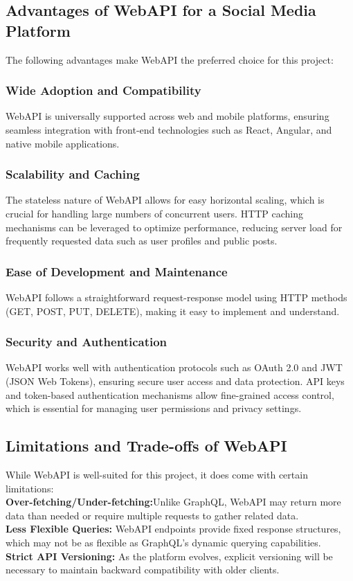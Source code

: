 \documentclass[a4paper, 11pt]{article}
\begin{document}
    \subsection{Advantages of WebAPI for a Social Media Platform}
    The following advantages make WebAPI the preferred choice for this project:

    \subsubsection{Wide Adoption and Compatibility}
    WebAPI is universally supported across web and mobile platforms, ensuring seamless integration with front-end technologies such as React, Angular, and native mobile applications.

    \subsubsection{Scalability and Caching}
    The stateless nature of WebAPI allows for easy horizontal scaling, which is crucial for handling large numbers of concurrent users.
    HTTP caching mechanisms can be leveraged to optimize performance, reducing server load for frequently requested data such as user profiles and public posts.

    \subsubsection{Ease of Development and Maintenance}
    WebAPI follows a straightforward request-response model using HTTP methods (GET, POST, PUT, DELETE), making it easy to implement and understand.

    \subsubsection{Security and Authentication}
    WebAPI works well with authentication protocols such as OAuth 2.0 and JWT (JSON Web Tokens), ensuring secure user access and data protection.
    API keys and token-based authentication mechanisms allow fine-grained access control, which is essential for managing user permissions and privacy settings.

    \subsection{Limitations and Trade-offs of WebAPI}
    While WebAPI is well-suited for this project, it does come with certain limitations:\\
    \textbf{Over-fetching/Under-fetching:}Unlike GraphQL, WebAPI may return more data than needed or require multiple requests to gather related data.\\
    \textbf{Less Flexible Queries:} WebAPI endpoints provide fixed response structures, which may not be as flexible as GraphQL’s dynamic querying capabilities.\\
    \textbf{Strict API Versioning:} As the platform evolves, explicit versioning will be necessary to maintain backward compatibility with older clients.
\end{document}
